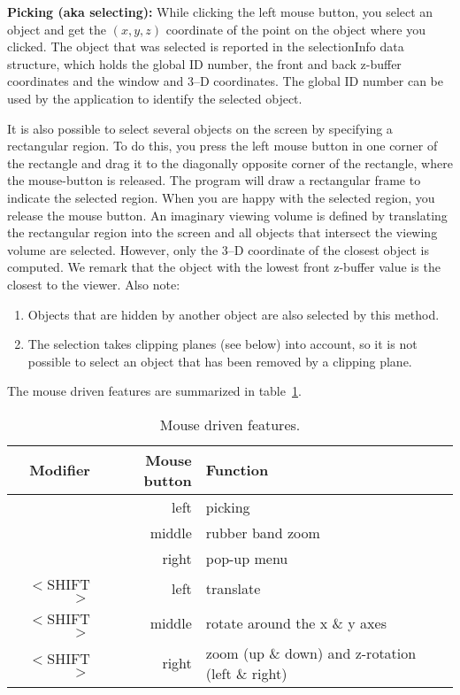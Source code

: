 \documentclass{article}
\begin{document}
{\bf Picking (aka selecting):} While clicking the left mouse button,
you select an object and get the $(x,y,z)$ coordinate of the point on
the object where you clicked. The object that was selected is reported
in the selectionInfo data structure, which holds the global ID number,
the front and back z-buffer coordinates and the window and 3--D
coordinates. The global ID number can be used by the application to
identify the selected object.

It is also possible to select several objects on the screen by
specifying a rectangular region. To do this, you press the left mouse
button in one corner of the rectangle and drag it to the diagonally
opposite corner of the rectangle, where the mouse-button is
released. The program will draw a rectangular frame to indicate the
selected region. When you are happy with the selected region, you
release the mouse button. An imaginary viewing volume is defined by
translating the rectangular region into the screen and all objects
that intersect the viewing volume are selected. However, only the 3--D
coordinate of the closest object is computed. We remark that the
object with the lowest front z-buffer value is the closest to the
viewer. Also note:
\begin{enumerate}
\item Objects that are hidden by another object are also selected by
this method.
\item The selection takes clipping planes (see below) into
account, so it is not possible to select an object that has been
removed by a clipping plane.
\end{enumerate}
%
The mouse driven features are summarized in table~\protect\ref{tab:mouse}.
\begin{table}[h]
\begin{center}
\begin{tabular}{r|r|l}  
Modifier      & Mouse button & Function                      \\ \hline\hline
              & left         & picking                       \\ \hline
              & middle       & rubber band zoom              \\ \hline
              & right        & pop-up menu                   \\ \hline
$<$SHIFT$>$   & left         & translate                     \\ \hline
$<$SHIFT$>$   & middle       & rotate around the x \& y axes \\ \hline
$<$SHIFT$>$   & right        & zoom (up \& down) and z-rotation (left \& right) \\ \hline
\end{tabular}
  \caption{Mouse driven features.}\label{tab:mouse}
\end{center}
\end{table}
\end{document}

